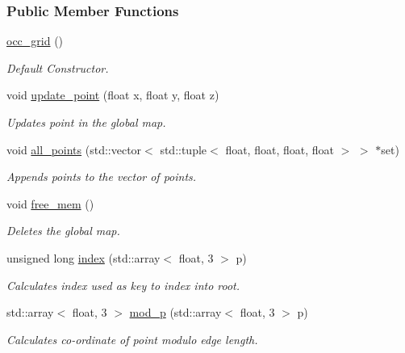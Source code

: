 \subsubsection*{Public Member Functions}
\begin{DoxyCompactItemize}
\item 
\hyperlink{classocc__grid_a2bd8f966cb86730569eef2322e4fe263}{occ\+\_\+grid} ()
\begin{DoxyCompactList}\small\item\em Default Constructor. \end{DoxyCompactList}\item 
void \hyperlink{classocc__grid_aaf38d339d7d1b3226d9673f8d6102b2c}{update\+\_\+point} (float x, float y, float z)
\begin{DoxyCompactList}\small\item\em Updates point in the global map. \end{DoxyCompactList}\item 
void \hyperlink{classocc__grid_a8b47af213fb57bf31c21ab1a9ef36505}{all\+\_\+points} (std\+::vector$<$ std\+::tuple$<$ float, float, float, float $>$ $>$ $\ast$set)
\begin{DoxyCompactList}\small\item\em Appends points to the vector of points. \end{DoxyCompactList}\item 
void \hyperlink{classocc__grid_adbfab59a1fb247d53a993fd9a2a26d67}{free\+\_\+mem} ()
\begin{DoxyCompactList}\small\item\em Deletes the global map. \end{DoxyCompactList}\item 
unsigned long \hyperlink{classocc__grid_a0fb045d82217675decfc9b9289ad35ea}{index} (std\+::array$<$ float, 3 $>$ p)
\begin{DoxyCompactList}\small\item\em Calculates index used as key to index into root. \end{DoxyCompactList}\item 
std\+::array$<$ float, 3 $>$ \hyperlink{classocc__grid_abf7ece8bcafa68e1292b0be52a5d9996}{mod\+\_\+p} (std\+::array$<$ float, 3 $>$ p)
\begin{DoxyCompactList}\small\item\em Calculates co-\/ordinate of point modulo edge length. \end{DoxyCompactList}\end{DoxyCompactItemize}
